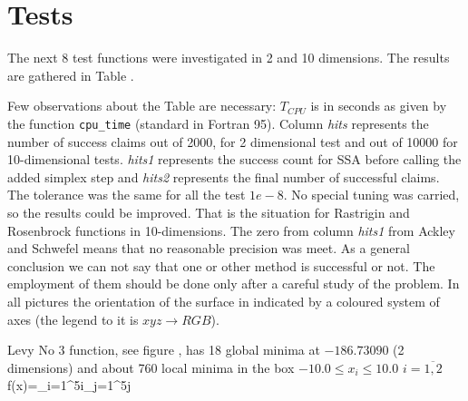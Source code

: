 \section{Tests}
\par{The next 8 test functions were investigated in 2 and 10 dimensions. The
results are gathered in Table .}
\par{Few observations about the Table  are necessary: $T_{CPU}$ is
in seconds as given by the function \verb|cpu_time| (standard in Fortran
95). Column \emph{hits} represents the number of success claims out of 2000,
for 2 dimensional test and out of 10000 for 10-dimensional tests. \emph{hits1}
represents the success count for SSA before calling the added simplex step and
\emph{hits2} represents the final number of successful claims. The tolerance
was the same for all the test $1e-8$. No special tuning was carried, so the results could be improved. That is the situation
for Rastrigin and Rosenbrock functions in 10-dimensions. The zero from column
\emph{hits1} from Ackley and Schwefel means that no reasonable precision was
meet. As a general conclusion we can not say that one or other method is
successful or not. The employment of them should be done only after a careful
study of the problem. In all pictures the orientation of the surface in
indicated by a coloured system of axes (the legend to it is $xyz\rightarrow RGB$).}
%
\par{Levy No 3 function, see figure ,  has 18 global minima at
$-186.73090$  (2 dimensions) and about 760 local minima in the box
$-10.0\leq x_i \leq 10.0$ $i=\overline{1,2}$}
%
\be
\label{levy3f}
f(x)=\sum_{i=1}^{5}i\cos[(i+1)x_1+i]\sum_{j=1}^{5}j\cos[(j+1)x_2+j]
\ee
%
